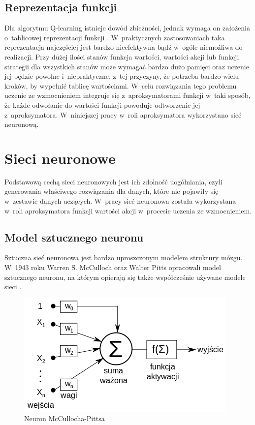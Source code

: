 \documentclass[a4paper, 12pt, oneside]{report}
\begin{document}
\section{Reprezentacja funkcji}
Dla algorytmu Q-learning istnieje dowód zbieżności, jednak wymaga on założenia o~tablicowej reprezentacji funkcji \cite{Cichosz00}. W~praktycznych zastosowaniach taka reprezentacja najczęściej jest bardzo nieefektywna bądź w~ogóle niemożliwa do realizacji. Przy dużej ilości stanów funkcja wartości, wartości akcji lub funkcji strategii dla wszystkich stanów może wymagać bardzo dużo pamięci oraz uczenie jej będzie powolne i~niepraktyczne, z~tej przyczyny, że potrzeba bardzo wielu kroków, by wypełnić tablicę wartościami. W~celu rozwiązania tego problemu uczenie ze wzmocnieniem integruje się z~aproksymatorami funkcji w~taki sposób, że każde odwołanie do wartości funkcji powoduje odtworzenie jej z~aproksymatora. W~niniejszej pracy w~roli aproksymatora wykorzystano sieć neuronową.

\chapter{Sieci neuronowe}

Podstawową cechą sieci neuronowych jest ich zdolność uogólniania, czyli generowania właściwego rozwiązania dla danych, które nie pojawiły się w~zestawie danych uczących. W~pracy sieć neuronowa została wykorzystana w~roli aproksymatora funkcji wartości akcji w~procesie uczenia ze wzmocnieniem.

\section{Model sztucznego neuronu}

Sztuczna sieć neuronowa jest bardzo uproszczonym modelem struktury mózgu. W~1943 roku Warren S. McCulloch oraz Walter Pitts opracowali model sztucznego neuronu, na którym opierają się także współcześnie używane modele sieci \cite{Flasinski11,Osowski96}.

\begin{figure}[htp]
\centering
\includegraphics[scale=0.6]{410px-Neuron_McCullocha-Pittsa.png}
\caption{Neuron McCullocha-Pittsa\protect\footnotemark}
\label{fig:neuron}
\end{figure}
\end{document}
